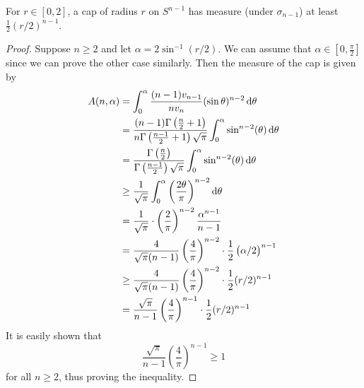 \begin{lemma}
    \label{spherical cap lower bound}
    For $r\in[0,2]$, a cap of radius $r$ on $S^{n-1}$ has measure (under $\sigma_{n-1}$) at least $\frac{1}{2}(r/2)^{n-1}$.
\end{lemma}
\begin{proof}
    Suppose $n\geq 2$ and let $\alpha =2\sin^{-1}(r/2)$. We can assume that $\alpha\in [0,\frac{\pi}{2}]$ since we can prove the other case similarly. Then the measure of the cap is given by
    \begin{align*}
        A(n,\alpha) &= \int_0^\alpha \frac{(n-1)v_{n-1}}{nv_n} (\sin\theta)^{n-2}\operatorname{d}\!{\theta}\\
            &= \frac{(n-1)\Gamma\left(\frac{n}{2}+1\right)}{n\Gamma\left(\frac{n-1}{2}+1\right)\sqrt{\pi}}\int_0^\alpha \sin^{n-2}(\theta)\operatorname{d}\!{\theta} \\
            &= \frac{\Gamma\left(\frac{n}{2}\right)}{\Gamma\left(\frac{n-1}{2}\right)\sqrt{\pi}}\int_0^\alpha \sin^{n-2}(\theta)\operatorname{d}\!{\theta} \\
            &\geq \frac{1}{\sqrt{\pi}}\int_0^\alpha \left(\frac{2\theta}{\pi}\right)^{n-2} \operatorname{d}\!{\theta} \\
            &= \frac{1}{\sqrt{\pi}}\cdot \left(\frac{2}{\pi}\right)^{n-2}\frac{\alpha^{n-1}}{n-1} \\
            &= \frac{4}{\sqrt{\pi}(n-1)} \left(\frac{4}{\pi}\right)^{n-2}\cdot \frac{1}{2}\left(\alpha/2\right)^{n-1} \\
            &\geq \frac{4}{\sqrt{\pi}(n-1)} \left(\frac{4}{\pi}\right)^{n-2}\cdot \frac{1}{2}(r/2)^{n-1} \\
            &= \frac{\sqrt{\pi}}{n-1} \left(\frac{4}{\pi}\right)^{n-1}\cdot \frac{1}{2}(r/2)^{n-1}
    \end{align*}
    It is easily shown that
    \[ \frac{\sqrt{\pi}}{n-1} \left(\frac{4}{\pi}\right)^{n-1} \geq 1\]
    for all $n\geq 2$, thus proving the inequality.
\end{proof}


